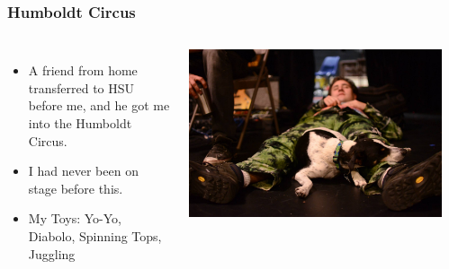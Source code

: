 \documentclass{beamer}
\begin{document}
\begin{frame}
	\frametitle{Humboldt Circus}
	\begin{columns}
	\begin{itemize}
		\item A friend from home transferred to HSU before me, and he got me into the Humboldt Circus.
		\item I had never been on stage before this.
		\item My Toys:  Yo-Yo, Diabolo, Spinning Tops, Juggling
	\end{itemize}
		\includegraphics[width = 1.0\textwidth]{images/1410944_10100133942385529_1241810700_o.jpg}
\begin{center}

\end{center}
\end{columns}
\end{frame}
\end{document}
